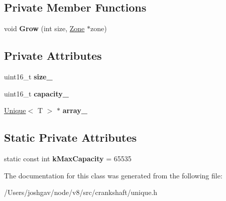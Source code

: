 \subsection*{Private Member Functions}
\begin{DoxyCompactItemize}
\item 
void {\bfseries Grow} (int size, \hyperlink{classv8_1_1internal_1_1_zone}{Zone} $\ast$zone)\hypertarget{classv8_1_1internal_1_1_unique_set_a93ed767ef09122eae917d97782987c1f}{}\label{classv8_1_1internal_1_1_unique_set_a93ed767ef09122eae917d97782987c1f}

\end{DoxyCompactItemize}
\subsection*{Private Attributes}
\begin{DoxyCompactItemize}
\item 
uint16\+\_\+t {\bfseries size\+\_\+}\hypertarget{classv8_1_1internal_1_1_unique_set_a2a1f68c995c19f76b61442a008e8ddc8}{}\label{classv8_1_1internal_1_1_unique_set_a2a1f68c995c19f76b61442a008e8ddc8}

\item 
uint16\+\_\+t {\bfseries capacity\+\_\+}\hypertarget{classv8_1_1internal_1_1_unique_set_a16e2f382c6c3013af540905de1ce1d33}{}\label{classv8_1_1internal_1_1_unique_set_a16e2f382c6c3013af540905de1ce1d33}

\item 
\hyperlink{classv8_1_1internal_1_1_unique}{Unique}$<$ T $>$ $\ast$ {\bfseries array\+\_\+}\hypertarget{classv8_1_1internal_1_1_unique_set_a9aab16b557562ce215d8c5e7ae633c73}{}\label{classv8_1_1internal_1_1_unique_set_a9aab16b557562ce215d8c5e7ae633c73}

\end{DoxyCompactItemize}
\subsection*{Static Private Attributes}
\begin{DoxyCompactItemize}
\item 
static const int {\bfseries k\+Max\+Capacity} = 65535\hypertarget{classv8_1_1internal_1_1_unique_set_a2ffe5c8e5c8a53d810241ab07a088df0}{}\label{classv8_1_1internal_1_1_unique_set_a2ffe5c8e5c8a53d810241ab07a088df0}

\end{DoxyCompactItemize}


The documentation for this class was generated from the following file\+:\begin{DoxyCompactItemize}
\item 
/\+Users/joshgav/node/v8/src/crankshaft/unique.\+h\end{DoxyCompactItemize}
